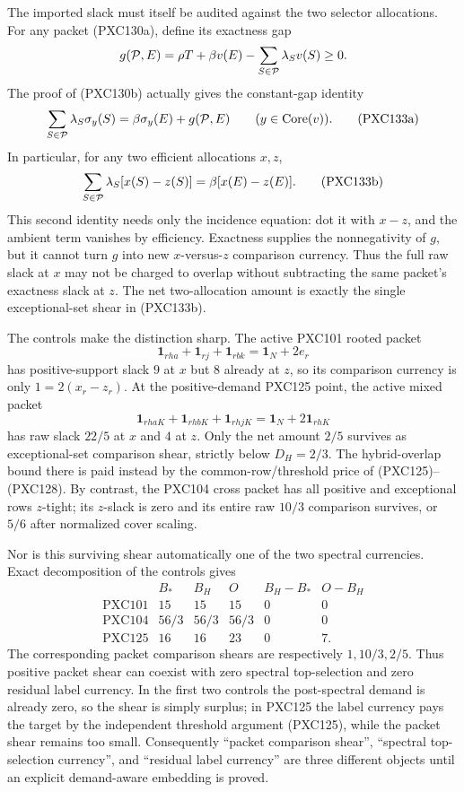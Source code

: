 \documentclass[11pt]{article}
\newcommand{\core}{\operatorname{Core}}
\newcommand{\one}{\mathbf 1}
\begin{document}
The imported slack must itself be audited against the two selector
allocations.  For any packet (PXC130a), define its exactness gap
\[
 g({\cal P},E)=\rho T+\beta v(E)
                 -\sum_{S\in{\cal P}}\lambda_Sv(S)\ge0.
\]
The proof of (PXC130b) actually gives the constant-gap identity
\begin{equation}
 \sum_{S\in{\cal P}}\lambda_S\sigma_y(S)
      =\beta\sigma_y(E)+g({\cal P},E)
      \qquad(y\in\core(v)).                            \tag{PXC133a}
\end{equation}
In particular, for any two efficient allocations \(x,z\),
\begin{equation}
 \sum_{S\in{\cal P}}\lambda_S[x(S)-z(S)]
      =\beta[x(E)-z(E)].                               \tag{PXC133b}
\end{equation}
This second identity needs only the incidence equation: dot it with
\(x-z\), and the ambient term vanishes by efficiency.  Exactness supplies
the nonnegativity of \(g\), but it cannot turn \(g\) into new
\(x\)-versus-\(z\) comparison currency.  Thus the full raw slack at \(x\)
may not be charged to overlap without subtracting the same packet's
exactness slack at \(z\).  The net two-allocation amount is exactly the
single exceptional-set shear in (PXC133b).

The controls make the distinction sharp.  The active PXC101 rooted packet
\[
 \one_{rha}+\one_{rj}+\one_{rbk}=\one_N+2e_r
\]
has positive-support slack \(9\) at \(x\) but \(8\) already at \(z\), so
its comparison currency is only \(1=2(x_r-z_r)\).  At the positive-demand
PXC125 point, the active mixed packet
\[
 \one_{rhaK}+\one_{rhbK}+\one_{rhjK}
       =\one_N+2\one_{rhK}
\]
has raw slack \(22/5\) at \(x\) and \(4\) at \(z\).  Only the net amount
\(2/5\) survives as exceptional-set comparison shear, strictly below
\(D_H=2/3\).  The
hybrid-overlap bound there is paid instead by the common-row/threshold
price of (PXC125)--(PXC128).  By contrast, the PXC104 cross packet has all
positive and exceptional rows \(z\)-tight; its \(z\)-slack is zero and its
entire raw \(10/3\) comparison survives, or \(5/6\) after normalized cover
scaling.

Nor is this surviving shear automatically one of the two spectral
currencies.  Exact decomposition of the controls gives
\[
\begin{array}{c|ccccc}
 &B_*&B_H&O&B_H-B_*&O-B_H\\ \hline
\text{PXC101}&15&15&15&0&0\\
\text{PXC104}&56/3&56/3&56/3&0&0\\
\text{PXC125}&16&16&23&0&7.
\end{array}
\]
The corresponding packet comparison shears are respectively
$1,10/3,2/5$.  Thus positive packet shear can coexist with zero spectral
top-selection and zero residual label currency.  In the first two controls
the post-spectral demand is already zero, so the shear is simply surplus;
in PXC125 the label currency pays the target by the independent threshold
argument (PXC125), while the packet shear remains too small.  Consequently
``packet comparison shear'', ``spectral top-selection currency'', and
``residual label currency'' are three different objects until an explicit
demand-aware embedding is proved.
\end{document}
